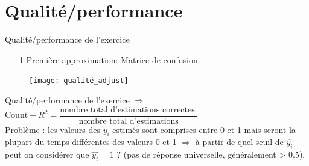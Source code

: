 \documentclass[12pt,aspectratio=1610]{beamer}
\begin{document}
\section{Qualité/performance}

\begin{frame}{Qualité/performance de l'exercice}
	\begin{enumerate}
	\item [1] Première approximation:  Matrice de confusion.
	
\end{enumerate}

	\begin{figure}
		\centering
		\texttt{[image: qualité\_adjust]}
	\end{figure}
\end{frame}
	
	\begin{frame}{Qualité/performance de l'exercice}
		$\Rightarrow$ $\text{Count}-R^2=\dfrac{\text{nombre total d'estimations correctes }}{\text{nombre total d'estimations}}$\\
		
		\underline{Problème} : les valeurs des $y_i$ estimés sont comprises entre 0 et 1 mais seront la plupart du temps différentes des valeurs 0 et 1 $\Rightarrow$ à partir de quel seuil de $\widehat{y_i}$ peut on considérer que $\widehat{y_i}=1$ ? (pas de réponse universelle, généralement > 0.5).

\end{frame}
\end{document}
